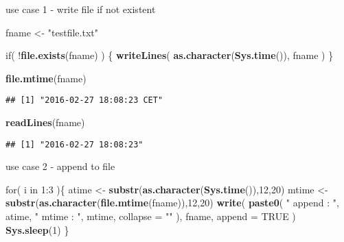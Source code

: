 \documentclass[ignorenonframetext,]{beamer}
\newenvironment{Shaded}{\begin{snugshade}}{\end{snugshade}}
\newcommand{\KeywordTok}[1]{\textcolor[rgb]{0.13,0.29,0.53}{\textbf{{#1}}}}
\newcommand{\DataTypeTok}[1]{\textcolor[rgb]{0.13,0.29,0.53}{{#1}}}
\newcommand{\DecValTok}[1]{\textcolor[rgb]{0.00,0.00,0.81}{{#1}}}
\newcommand{\StringTok}[1]{\textcolor[rgb]{0.31,0.60,0.02}{{#1}}}
\newcommand{\OtherTok}[1]{\textcolor[rgb]{0.56,0.35,0.01}{{#1}}}
\newcommand{\NormalTok}[1]{{#1}}
\begin{document}
\begin{frame}[fragile]{use case 1 - write file if not existent}

\begin{Shaded}
\begin{Highlighting}[]
\NormalTok{fname <-}\StringTok{ "testfile.txt"}

\NormalTok{if( !}\KeywordTok{file.exists}\NormalTok{(fname)  ) \{}
  \KeywordTok{writeLines}\NormalTok{( }\KeywordTok{as.character}\NormalTok{(}\KeywordTok{Sys.time}\NormalTok{()), fname )}
\NormalTok{\}}

\KeywordTok{file.mtime}\NormalTok{(fname)}
\end{Highlighting}
\end{Shaded}

\begin{verbatim}
## [1] "2016-02-27 18:08:23 CET"
\end{verbatim}

\begin{Shaded}
\begin{Highlighting}[]
\KeywordTok{readLines}\NormalTok{(fname)}
\end{Highlighting}
\end{Shaded}

\begin{verbatim}
## [1] "2016-02-27 18:08:23"
\end{verbatim}

\end{frame}

\begin{frame}[fragile]{use case 2 - append to file}

\begin{Shaded}
\begin{Highlighting}[]
\NormalTok{for( i in }\DecValTok{1}\NormalTok{:}\DecValTok{3} \NormalTok{)\{}
  \NormalTok{atime <-}\StringTok{ }\KeywordTok{substr}\NormalTok{(}\KeywordTok{as.character}\NormalTok{(}\KeywordTok{Sys.time}\NormalTok{()),}\DecValTok{12}\NormalTok{,}\DecValTok{20}\NormalTok{)}
  \NormalTok{mtime <-}\StringTok{ }\KeywordTok{substr}\NormalTok{(}\KeywordTok{as.character}\NormalTok{(}\KeywordTok{file.mtime}\NormalTok{(fname)),}\DecValTok{12}\NormalTok{,}\DecValTok{20}\NormalTok{)}
  \KeywordTok{write}\NormalTok{(}
    \KeywordTok{paste0}\NormalTok{(}
      \StringTok{" append : "}\NormalTok{, atime, }\StringTok{"   mtime : "}\NormalTok{, mtime, }
      \DataTypeTok{collapse =} \StringTok{""}
    \NormalTok{), }
    \NormalTok{fname, }
    \DataTypeTok{append =} \OtherTok{TRUE}
  \NormalTok{)}
  \KeywordTok{Sys.sleep}\NormalTok{(}\DecValTok{1}\NormalTok{)}
\NormalTok{\}}
\end{Highlighting}
\end{Shaded}

\end{frame}
\end{document}

